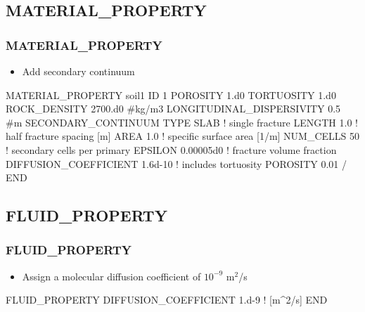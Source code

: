 \documentclass{beamer}
\newcommand\bluecomment[1]{{{\color{blue} #1}}}
\newcommand\magentacomment[1]{{{\color{magenta} #1}}}
\begin{document}
\subsection{MATERIAL\_PROPERTY}

\begin{frame}\frametitle{MATERIAL\_PROPERTY}

\begin{itemize}
  \item Add secondary continuum
\end{itemize}

\begin{semiverbatim}
MATERIAL_PROPERTY soil1
  ID 1
  POROSITY 1.d0
  TORTUOSITY 1.d0
  ROCK_DENSITY 2700.d0 #kg/m3
  LONGITUDINAL_DISPERSIVITY 0.5 #m
  \magentacomment{SECONDARY_CONTINUUM
    TYPE SLAB               \bluecomment{! single fracture}
    LENGTH 1.0              \bluecomment{! half fracture spacing [m]}
    AREA 1.0                \bluecomment{! specific surface area [1/m]}
    NUM_CELLS 50            \bluecomment{! secondary cells per primary}
    EPSILON 0.00005d0       \bluecomment{! fracture volume fraction}
    DIFFUSION_COEFFICIENT 1.6d-10  \bluecomment{! includes tortuosity}
    POROSITY 0.01
  / }
END
\end{semiverbatim}

\end{frame}

\subsection{FLUID\_PROPERTY}

\begin{frame}\frametitle{FLUID\_PROPERTY}

\begin{itemize}
  \item Assign a molecular diffusion coefficient of $10^{-9}$ m$^2$/s
\end{itemize}

\begin{semiverbatim}

FLUID_PROPERTY
  DIFFUSION_COEFFICIENT 1.d-9   \bluecomment{! [m^2/s]}
END
\end{semiverbatim}

\end{frame}
\end{document}

